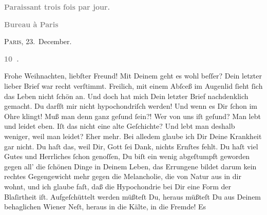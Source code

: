 \begin{ledgroupsized}[t]{13cm}
           \pstart
           \begin{otherlanguage}{french}\textcolor{gray}{\textbf{\textbf{Paraissant trois fois par jour.}}}\end{otherlanguage}\pend
           \pstart
           \begin{otherlanguage}{french}\textcolor{gray}{\textbf{\textbf{Bureau à Paris}}}\end{otherlanguage}\hfill \textsc{Paris}, 23. December.\pend
           \pstart
           \begin{otherlanguage}{french}\textcolor{gray}{\textbf{\textbf{10 .}}}\end{otherlanguage}\pend
           \pstart{}Frohe Weihnachten, liebſter Freund!\pend\pstart
           Mit Deinem \label{K_L02834-1v}\label{K_L02834-1h}
               geht es wohl beſſer? Dein letzter lieber Brief war recht verſtimmt. Freilich, mit
               einem Abſceß im Augenlid ſieht ſich das Leben nicht ſchön an.\pend
           \pstart
           Und doch hat mich Dein letzter Brief nachdenklich gemacht. Du darfſt mir nicht
               hypochondriſch werden! Und wenn es Dir ſchon im Ohre klingt! Muß man denn ganz geſund
               ſein?! Wer von uns iſt geſund? Man lebt und leidet eben. Iſt das nicht eine alte
               Geſchichte? Und lebt man deshalb weniger, weil man leidet? Eher mehr.\pend
           \pstart
           {\pb}Bei alledem glaube ich Dir Deine Krankheit gar
               nicht. Du haſt das, weil Dir, Gott ſei Dank, nichts Ernſtes fehlt. Du haſt viel Gutes
               und Herrliches ſchon genoſſen, Du biſt ein wenig abgeſtumpft geworden gegen all’ die
               ſchönen Dinge in Deinem Leben, das Errungene bildet darum kein rechtes Gegengewicht
               mehr gegen die Melancholie, die von Natur aus in dir wohnt, und ich glaube faſt, daß
               die Hypochondrie bei Dir eine Form der Blaſirtheit iſt.\pend
           \pstart
           Aufgeſchüttelt werden müßteſt Du, heraus müßteſt Du aus Deinem behaglichen Wiener Neſt, heraus in die Kälte, in die Fremde! Es

\end{ledgroupsized}
